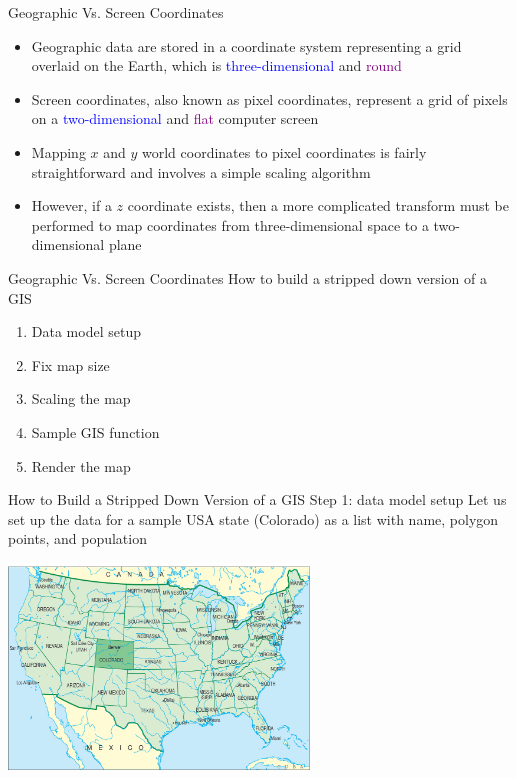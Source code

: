 \documentclass[notes, aspectratio=1610]{beamer}
\begin{document}
\begin{frame}{Geographic Vs. Screen Coordinates}{}
    \begin{itemize}
    	\item Geographic data are stored in a coordinate system representing a 
    	grid overlaid on the Earth, which is \textcolor{blue}{three-dimensional}
	and \textcolor{purple}{round}
	\pause
    	\item Screen coordinates, also known as pixel coordinates, represent a 
    	grid of pixels on a \textcolor{blue}{two-dimensional} and \textcolor{purple}
	{flat} computer screen
	\pause
    	\item Mapping $x$ and $y$ world coordinates to pixel coordinates is fairly 
    	straightforward and involves a simple scaling algorithm
	\pause
    	\item However, if a $z$ coordinate exists, then a more complicated 
    	transform must be performed to map coordinates from three-dimensional 
    	space to a two-dimensional plane
    \end{itemize}
\end{frame}

\begin{frame}{Geographic Vs. Screen Coordinates}
	{How to build a stripped down version of a GIS}
	\begin{enumerate}
		\item Data model setup 
		\item Fix map size 
		\item Scaling the map 
		\item Sample GIS function 
		\item Render the map
	\end{enumerate}
\end{frame}

\begin{frame}{How to Build a Stripped Down Version of a GIS}
	{Step 1: data model setup}
	Let us set up the data for a sample USA state (Colorado) as a 
	list with name, polygon points, and population

	\centering

	\includegraphics[width=0.6\textwidth]{images/colorado}
\end{frame}
\end{document}
